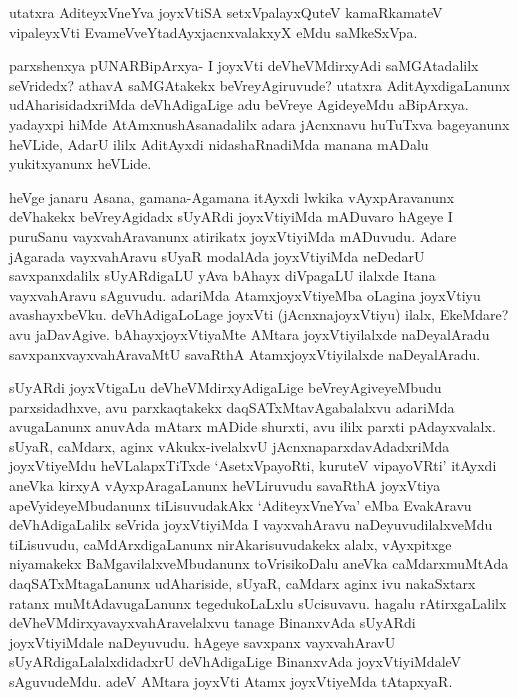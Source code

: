 \begin{artha}%
utatxra AditeyxVneYva joyxVtiSA setxVpalayxQuteV kamaRkamateV vipaleyxVti EvameVveYtadAyxjacnxvalakxyX eMdu saMkeSxVpa. 

parxshenxya pUNARBipArxya- I joyxVti deVheVMdirxyAdi saMGAtadalilx seVridedx? athavA saMGAtakekx beVreyAgiruvude? utatxra AditAyxdigaLanunx udAharisidadxriMda deVhAdigaLige adu beVreye AgideyeMdu aBipArxya. yadayxpi hiMde AtAmxnushAsanadalilx adara jAcnxnavu huTuTxva bageyanunx heVLide, AdarU ililx AditAyxdi nidashaRnadiMda manana mADalu yukitxyanunx heVLide. 
\end{artha}

\begin{artha}
heVge janaru Asana, gamana-Agamana itAyxdi lwkika vAyxpAravanunx deVhakekx beVreyAgidadx sUyARdi joyxVtiyiMda mADuvaro hAgeye I puruSanu vayxvahAravanunx atirikatx joyxVtiyiMda mADuvudu. Adare jAgarada vayxvahAravu sUyaR modalAda joyxVtiyiMda neDedarU savxpanxdalilx sUyARdigaLU yAva bAhayx diVpagaLU ilalxde Itana vayxvahAravu sAguvudu. adariMda AtamxjoyxVtiyeMba oLagina joyxVtiyu avashayxbeVku. deVhAdigaLoLage joyxVti (jAcnxnajoyxVtiyu) ilalx, EkeMdare? avu jaDavAgive. bAhayxjoyxVtiyaMte AMtara joyxVtiyilalxde naDeyalAradu savxpanxvayxvahAravaMtU savaRthA AtamxjoyxVtiyilalxde naDeyalAradu.  
\end{artha}

\begin{artha}
sUyARdi joyxVtigaLu deVheVMdirxyAdigaLige beVreyAgiveyeMbudu parxsidadhxve, avu parxkaqtakekx daqSATxMtavAgabalalxvu adariMda avugaLanunx anuvAda mAtarx mADide shurxti, avu ililx parxti pAdayxvalalx. sUyaR, caMdarx, aginx vAkukx-ivelalxvU jAcnxnaparxdavAdadxriMda joyxVtiyeMdu heVLalapxTiTxde `AsetxVpayoRti, kuruteV vipayoVRti' itAyxdi aneVka kirxyA vAyxpAragaLanunx heVLiruvudu savaRthA joyxVtiya apeVyideyeMbudanunx tiLisuvudakAkx `AditeyxVneYva' eMba EvakAravu deVhAdigaLalilx seVrida joyxVtiyiMda I vayxvahAravu naDeyuvudilalxveMdu tiLisuvudu, caMdArxdigaLanunx nirAkarisuvudakekx alalx, vAyxpitxge niyamakekx BaMgavilalxveMbudanunx toVrisikoDalu aneVka caMdarxmuMtAda daqSATxMtagaLanunx udAhariside, sUyaR, caMdarx aginx ivu nakaSxtarx ratanx muMtAdavugaLanunx tegedukoLaLxlu sUcisuvavu. hagalu rAtirxgaLalilx deVheVMdirxyavayxvahAravelalxvu tanage BinanxvAda sUyARdi joyxVtiyiMdale naDeyuvudu. hAgeye savxpanx vayxvahAravU sUyARdigaLalalxdidadxrU deVhAdigaLige BinanxvAda joyxVtiyiMdaleV sAguvudeMdu. adeV AMtara joyxVti Atamx joyxVtiyeMda tAtapxyaR.
\end{artha}

